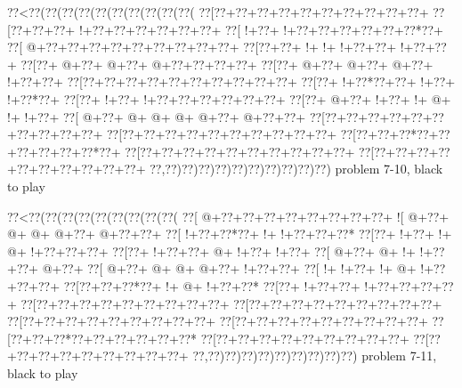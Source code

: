 \vbox{\vbox{\goo
\0??<\0??(\0??(\0??(\0??(\0??(\0??(\0??(\0??(\0??(\0??(
\0??[\0??+\0??+\0??+\0??+\0??+\0??+\0??+\0??+\0??+\0??+
\0??[\0??+\0??+\0??+\- !+\0??+\0??+\0??+\0??+\0??+\0??+
\0??[\- !+\0??+\- !+\0??+\0??+\0??+\0??+\0??+\0??*\0??+
\0??[\- @+\0??+\0??+\0??+\0??+\0??+\0??+\0??+\0??+\0??+
\0??[\0??+\0??+\- !+\- !+\- !+\0??+\0??+\- !+\0??+\0??+
\0??[\0??+\- @+\0??+\- @+\0??+\- @+\0??+\0??+\0??+\0??+
\0??[\0??+\- @+\0??+\- @+\0??+\- @+\0??+\- !+\0??+\0??+
\0??[\0??+\0??+\0??+\0??+\0??+\0??+\0??+\0??+\0??+\0??+
\0??[\0??+\- !+\0??*\0??+\0??+\- !+\0??+\- !+\0??*\0??+
\0??[\0??+\- !+\0??+\- !+\0??+\0??+\0??+\0??+\0??+\0??+
\0??[\0??+\- @+\0??+\- !+\0??+\- !+\- @+\- !+\- !+\0??+
\0??[\- @+\0??+\- @+\- @+\- @+\- @+\0??+\- @+\0??+\0??+
\0??[\0??+\0??+\0??+\0??+\0??+\0??+\0??+\0??+\0??+\0??+
\0??[\0??+\0??+\0??+\0??+\0??+\0??+\0??+\0??+\0??+\0??+
\0??[\0??+\0??+\0??*\0??+\0??+\0??+\0??+\0??+\0??*\0??+
\0??[\0??+\0??+\0??+\0??+\0??+\0??+\0??+\0??+\0??+\0??+
\0??[\0??+\0??+\0??+\0??+\0??+\0??+\0??+\0??+\0??+\0??+
\0??,\0??)\0??)\0??)\0??)\0??)\0??)\0??)\0??)\0??)\0??)
}
\hfil problem 7-10, black to play\hfil\break
}

\vbox{\vbox{\goo
\0??<\0??(\0??(\0??(\0??(\0??(\0??(\0??(\0??(\0??(
\0??[\- @+\0??+\0??+\0??+\0??+\0??+\0??+\0??+\0??+
\- ![\- @+\0??+\- @+\- @+\- @+\0??+\- @+\0??+\0??+
\0??[\- !+\0??+\0??*\0??+\- !+\- !+\0??+\0??+\0??*
\0??[\0??+\- !+\0??+\- !+\- @+\- !+\0??+\0??+\0??+
\0??[\0??+\- !+\0??+\0??+\- @+\- !+\0??+\- !+\0??+
\0??[\- @+\0??+\- @+\- !+\- !+\0??+\0??+\- @+\0??+
\0??[\- @+\0??+\- @+\- @+\- @+\0??+\- !+\0??+\0??+
\0??[\- !+\- !+\0??+\- !+\- @+\- !+\0??+\0??+\0??+
\0??[\0??+\0??+\0??*\0??+\- !+\- @+\- !+\0??+\0??*
\0??[\0??+\- !+\0??+\0??+\- !+\0??+\0??+\0??+\0??+
\0??[\0??+\0??+\0??+\0??+\0??+\0??+\0??+\0??+\0??+
\0??[\0??+\0??+\0??+\0??+\0??+\0??+\0??+\0??+\0??+
\0??[\0??+\0??+\0??+\0??+\0??+\0??+\0??+\0??+\0??+
\0??[\0??+\0??+\0??+\0??+\0??+\0??+\0??+\0??+\0??+
\0??[\0??+\0??+\0??*\0??+\0??+\0??+\0??+\0??+\0??*
\0??[\0??+\0??+\0??+\0??+\0??+\0??+\0??+\0??+\0??+
\0??[\0??+\0??+\0??+\0??+\0??+\0??+\0??+\0??+\0??+
\0??,\0??)\0??)\0??)\0??)\0??)\0??)\0??)\0??)\0??)
}
\hfil problem 7-11, black to play\hfil\break
}

